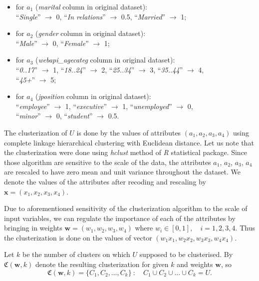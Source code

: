 \documentclass[runningheads,a4paper]{llncs}
\begin{document}
\begin{itemize}
\item for $a_1$ (\textit{marital} column in original dataset): \\ 
	``\textit{Single}''  $\to$ 0,  \qquad  ``\textit{In relations}''  $\to$ 0.5, \qquad  ``\textit{Married}''  $\to$ 1;
	\smallskip
	
\item for $a_2$ (\textit{gender} column in original dataset): \\ 
	``\textit{Male}''  $\to$ 0, \qquad  ``\textit{Female}'' $\to$ 1;
	\smallskip
	
\item for $a_3$ (\textit{webapi\_agecateg} column in original dataset): \\ 
	``\textit{0..17}''  $\to$ 1, \qquad  ``\textit{18..24}''  $\to$ 2, \qquad     ``\textit{25..34}''  $\to$ 3, \qquad  ``\textit{35..44}''  $\to$ 4, \\     ``\textit{45+}''  $\to$ 5;
	\smallskip
		
\item for $a_4$ (\textit{jposition} column in original dataset): \\ 
	``\textit{employee}'' $\to$ 1, \qquad  ``\textit{executive}'' $\to$ 1, \qquad  ``\textit{unemployed}'' $\to$ 0, \\  ``\textit{minor}'' $\to$ 0, \qquad  ``\textit{student}'' $\to$ 0.5.
\end{itemize}

The clusterization of $U$ is done by the values of attributes $(a_1, a_2, a_3, a_4)$ using complete linkage hierarchical clustering \cite{hclust} with Euclidean distance. Let us note that the clusterization were done using \textit{hclust} method of \textit{R} statistical package. Since those algorithm are sensitive to the scale of the data, the attributes $a_1$, $a_2$, $a_3$, $a_4$ are rescaled to have zero mean and unit variance throughout the dataset. We denote the values of the attributes after recoding and rescaling by $\boldsymbol{x} = (x_1, x_2, x_3, x_4)$.

Due to aforementioned sensitivity of the clusterization algorithm to the scale of input variables, we can regulate the importance of each of the attributes by bringing in weights $\boldsymbol{w} = (w_1, w_2, w_3, w_4)$ where \quad $w_i \in [0, 1], \quad i = 1,2,3,4$. Thus the clusterization is done on the values of vector $(w_1 x_1, w_2 x_2, w_3 x_3, w_4 x_4)$.

Let $k$ be the number of clusters on which $U$ supposed to be clusterised. By $\mathfrak{C}(\boldsymbol{w}, k)$ denote the resulting clusterization for given $k$ and weights $\boldsymbol{w}$, so
\[
	\mathfrak{C}(\boldsymbol{w}, k) = \{C_1, C_2, \dots, C_k\} \  \colon  \quad  C_1 \cup C_2 \cup \dots \cup C_k = U.
\]
\end{document}
